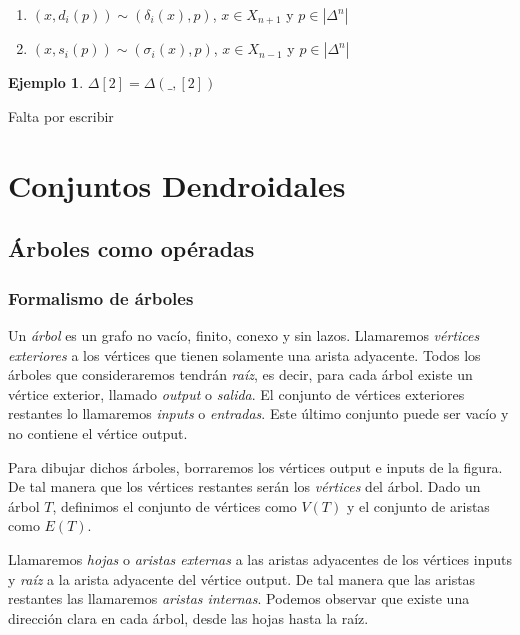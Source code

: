 \documentclass[11pt,a4paper,openright,oneside]{article}
\numberwithin{equation}{section}
\theoremstyle{definition}
\newtheorem{ex}[teo]{Ejemplo}
\begin{document}
\begin{enumerate}[(1)]
    \item $(x, d_i(p)) \sim (\delta_i(x), p)$, $x\in X_{n+1}$ y $p\in|\Delta^n|$
    \item $(x, s_i(p)) \sim (\sigma_i(x), p)$, $x\in X_{n-1}$ y $p\in|\Delta^n|$
\end{enumerate}

\begin{ex}
    $\Delta[2] = \Delta(\_, [2])$
\end{ex}
Falta por escribir



\newpage
\section{Conjuntos Dendroidales}

\subsection{\'Arboles como op\'eradas}
\subsubsection{Formalismo de \'arboles}
Un \emph{\'arbol} es un grafo no vac\'io, finito, conexo y sin lazos. Llamaremos \emph{v\'ertices exteriores} a los v\'ertices que tienen solamente una arista adyacente.
Todos los \'arboles que consideraremos tendr\'an \emph{ra\'iz}, es decir, para cada \'arbol existe un v\'ertice exterior, llamado \emph{output} o \emph{salida}. El conjunto de v\'ertices exteriores restantes lo llamaremos \emph{inputs} o \emph{entradas}. Este \'ultimo conjunto puede ser vac\'io y no contiene el v\'ertice output.

Para dibujar dichos \'arboles, borraremos los v\'ertices output e inputs de la figura. De tal manera que los v\'ertices restantes ser\'an los \emph{v\'ertices} del \'arbol.
Dado un \'arbol $T$, definimos el conjunto de v\'ertices como $V(T)$ y el conjunto de aristas como $E(T)$.

Llamaremos \emph{hojas} o \emph{aristas externas} a las aristas adyacentes de los v\'ertices inputs y \emph{ra\'iz} a la arista adyacente del v\'ertice output.
De tal manera que las aristas restantes las llamaremos \emph{aristas internas}. Podemos observar que existe una direcci\'on clara en cada \'arbol, desde las hojas hasta la ra\'iz.
\end{document}
